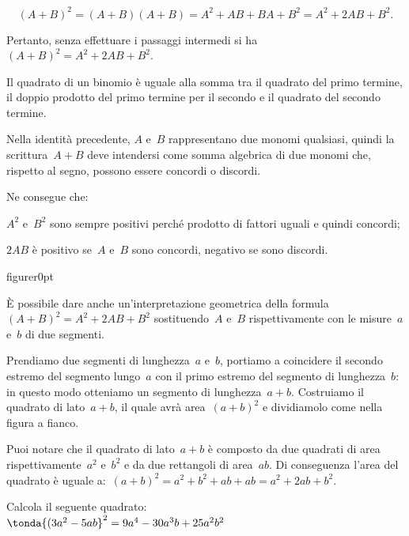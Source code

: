 \[\left(A+B\right)^{2}=\left(A+B\right)\left(A+B\right)=A^{2}+{AB}+{BA}+B^{2
}=A^{2}+2{AB}+B^{2}.\]

Pertanto, senza effettuare i passaggi intermedi si 
ha~\(\left(A+B\right)^{2}=A^{2}+2{AB}+B^{2}\).

\osservazione Il quadrato di un binomio è
uguale alla somma tra il quadrato del primo termine, il doppio prodotto del 
primo termine per il secondo e il quadrato del secondo termine.

Nella identità precedente, \(A\) e~\(B\) rappresentano due monomi qualsiasi,
quindi la scrittura~\(A+B\) deve intendersi come somma algebrica di due
monomi che, rispetto al segno, possono essere concordi o discordi.

Ne consegue che:

\begin{enumeratea}
\item \(A^{2}\) e~\(B^{2}\) sono sempre positivi
perché prodotto di fattori uguali e quindi concordi;
\item \(2AB\) è positivo se~\(A\) e~\(B\) sono concordi, negativo se sono
discordi.
\end{enumeratea}

\begin{wrapfloat}{figure}{r}{0pt}
 
\end{wrapfloat}

È possibile dare anche
un'interpretazione geometrica della 
formula~\(\left(A+B\right)^{2}=A^{2}+2{AB}+B^{2}\)
sostituendo~\(A\) e~\(B\) rispettivamente con le misure~\(a\) e~\(b\)
di due segmenti.

Prendiamo due segmenti di lunghezza~\(a\) e~\(b\), portiamo a
coincidere il secondo estremo del segmento lungo~\(a\) con il
primo estremo del segmento di lunghezza~\(b\): in questo modo
otteniamo un segmento di lunghezza~\(a+b\). Costruiamo il quadrato di
lato~\(a+b\), il quale avrà area~\((a+b)^{2}\) e dividiamolo come
nella figura a fianco.

Puoi notare che il quadrato di lato~\(a+b\) è composto da due quadrati
di area rispettivamente~\(a^{2}\) e~\(b^{2}\) e
da due rettangoli di area~\(ab\). Di conseguenza
l'area del quadrato è uguale 
a:~\((a+b)^{2}=a^{2}+b^{2}+{ab}+{ab}=a^{2}+2{ab}+b^{2}\).

\begin{esempio} Calcola il seguente quadrato:\\
\(\tonda{(3a^2-5ab}^2 = 9a^4 - 30 a^3 b + 25a^2 b^2\)
\end{esempio}

